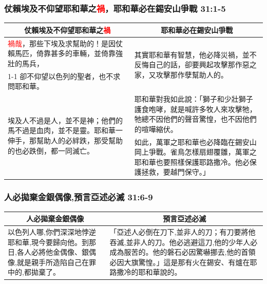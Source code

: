 \subsubsection{仗賴埃及不仰望耶和華之\textcolor{red}{禍}，耶和華必在錫安山爭戰 31:1-5}
\begin{table}[H]
\centering
\begin{tabular}{p{6.7cm}|p{11.0cm}}\hline\hline
\multicolumn{1}{c|}{仗賴埃及不仰望耶和華之\textcolor{red}{禍}}&\multicolumn{1}{c}{耶和華必在錫安山爭戰}\\\hline
\textcolor{red}{禍哉}，那些下埃及求幫助的！是因仗賴馬匹，倚靠甚多的車輛，並倚靠強壯的馬兵，
&\multirow{2}{11.1cm}{其實耶和華有智慧，他必降災禍，並不反悔自己的話，卻要興起攻擊那作惡之家，又攻擊那作孽幫助人的。}\\\cline{1-1}
卻不仰望以色列的聖者，也不求問耶和華。&\\\hline
\multirow{2}{6.8cm}{埃及人不過是人，並不是神；他們的馬不過是血肉，並不是靈。耶和華一伸手，那幫助人的必絆跌，那受幫助的也必跌倒，都一同滅亡。}
&耶和華對我如此說：「獅子和少壯獅子護食咆哮，就是喊許多牧人來攻擊牠，牠總不因他們的聲音驚惶，也不因他們的喧嘩縮伏。\\\cline{2-2}
&如此，萬軍之耶和華也必降臨在錫安山岡上爭戰。雀鳥怎樣扇翅覆雛，萬軍之耶和華也要照樣保護耶路撒冷。他必保護拯救，要越門保守。」 \\\hline
\end{tabular}
\end{table}


\subsubsection{人必拋棄金銀偶像,預言亞述必滅  31:6-9}
\begin{table}[H]
\centering
\begin{tabular}{p{6.9cm}|p{10.9cm}}\hline\hline
\multicolumn{1}{c|}{人必拋棄金銀偶像}&\multicolumn{1}{c}{預言亞述必滅}\\\hline
以色列人哪,你們深深地悖逆耶和華,現今要歸向他。到那日,各人必將他金偶像、銀偶像,就是親手所造陷自己在罪中的,都拋棄了。
&「亞述人必倒在刀下,並非人的刀；有刀要將他吞滅,並非人的刀。他必逃避這刀,他的少年人必成為服苦的。他的磐石必因驚嚇挪去,他的首領必因大旗驚惶。」這是那有火在錫安、有爐在耶路撒冷的耶和華說的。 \\\hline
\end{tabular}
\end{table}

